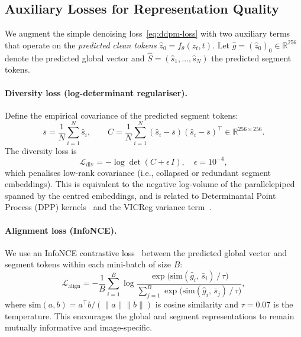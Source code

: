 \documentclass[12pt]{article}
\begin{document}
\subsection{Auxiliary Losses for Representation Quality}
\label{sec:aux-losses}

We augment the simple denoising loss~\eqref{eq:ddpm-loss} with two
auxiliary terms that operate on the \emph{predicted clean tokens}
$\hat{z}_0 = f_\theta(z_t, t)$.
Let $\hat{g} = (\hat{z}_0)_0 \in \mathbb{R}^{256}$ denote the predicted
global vector and $\hat{S} = (\hat{s}_1, \ldots, \hat{s}_N)$ the predicted
segment tokens.

\paragraph{Diversity loss (log-determinant regulariser).}
Define the empirical covariance of the predicted segment tokens:
\begin{equation}\label{eq:seg-cov}
    \bar{s} = \frac{1}{N}\sum_{i=1}^{N} \hat{s}_i,
    \qquad
    C = \frac{1}{N}\sum_{i=1}^{N}
    (\hat{s}_i - \bar{s})(\hat{s}_i - \bar{s})^\top
    \in \mathbb{R}^{256 \times 256}.
\end{equation}
The diversity loss is
\begin{equation}\label{eq:div-loss}
    \mathcal{L}_{\mathrm{div}} = -\log\det(C + \epsilon\, I),
    \quad \epsilon = 10^{-4},
\end{equation}
which penalises low-rank covariance (i.e., collapsed or redundant
segment embeddings).
This is equivalent to the negative log-volume of the parallelepiped
spanned by the centred embeddings, and is related to Determinantal
Point Process (DPP) kernels~\cite{kulesza2012dpp} and the VICReg
variance term~\cite{bardes2022vicreg}.

\paragraph{Alignment loss (InfoNCE).}
We use an InfoNCE contrastive loss~\cite{oord2018infonce} between
the predicted global vector and segment tokens within each mini-batch
of size $B$:
\begin{equation}\label{eq:align-loss}
    \mathcal{L}_{\mathrm{align}}
    = -\frac{1}{B}\sum_{i=1}^{B}
    \log \frac{
    \exp\!\bigl(\mathrm{sim}(\hat{g}_i,\, \bar{s}_i)\,/\,\tau\bigr)
    }{
    \sum_{j=1}^{B}
    \exp\!\bigl(\mathrm{sim}(\hat{g}_i,\, \bar{s}_j)\,/\,\tau\bigr)
    },
\end{equation}
where $\mathrm{sim}(a, b) = a^\top b / (\lVert a \rVert \lVert b \rVert)$
is cosine similarity and $\tau = 0.07$ is the temperature.
This encourages the global and segment representations to remain
mutually informative and image-specific.
\end{document}
